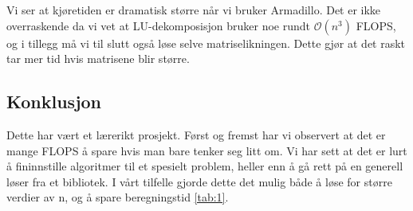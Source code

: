 \documentclass[11pt]{article}
\begin{document}
Vi ser at kjøretiden er dramatisk større når vi bruker Armadillo. Det
er ikke overraskende da vi vet at LU-dekomposisjon bruker noe rundt
$\mathcal{O}(n^3)$ FLOPS, og i tillegg må vi til slutt også løse selve
matriselikningen. Dette gjør at det raskt tar mer tid hvis matrisene
blir større.


\subsection{Konklusjon}
Dette har vært et lærerikt prosjekt. Først og fremst har vi observert at det er mange FLOPS å spare hvis man bare tenker seg litt om. Vi har sett at det er lurt å fininnstille algoritmer til et spesielt problem, heller enn å gå rett på en generell løser fra et bibliotek. I vårt tilfelle gjorde dette det mulig både å løse for større verdier av n, og å spare beregningstid \ref{tab:1}.
\end{document}
